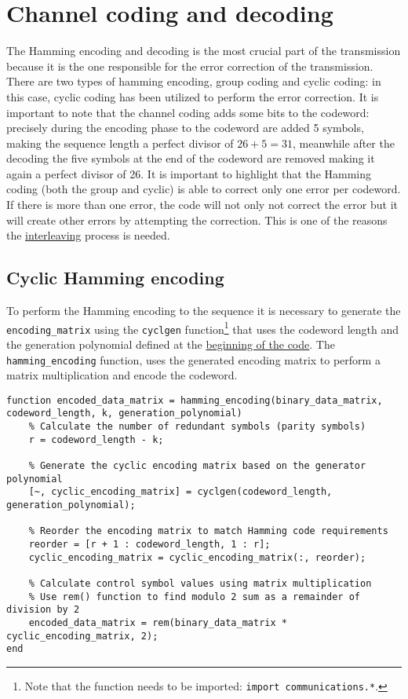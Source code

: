 \vspace{40px} \section{Channel coding and decoding}
The Hamming encoding and decoding is the most crucial part of the transmission because it is the one responsible for the error correction of the transmission. There are two types of hamming encoding, group coding and cyclic coding: in this case, cyclic coding has been utilized to perform the error correction. It is important to note that the channel coding adds some bits to the codeword: precisely during the encoding phase to the codeword are added 5 symbols, making the sequence length a perfect divisor of $26 + 5 = 31$, meanwhile after the decoding the five symbols at the end of the codeword are removed making it again a perfect divisor of 26. It is important to highlight that the Hamming coding (both the group and cyclic) is able to correct only one error per codeword. If there is more than one error, the code will not only not correct the error but it will create other errors by attempting the correction. This is one of the reasons the \hyperref[interleaving]{interleaving} process is needed.





\subsection{Cyclic Hamming encoding}
To perform the Hamming encoding to the sequence it is necessary to generate the \texttt{encoding\_matrix} using the \texttt{cyclgen} function\footnote{Note that the function needs to be imported: \texttt{import communications.*}.} that uses the codeword length and the generation polynomial defined at the \hyperref[initial-parameters]{beginning of the code}. The \texttt{hamming\_encoding} function, uses the generated encoding matrix to perform a matrix multiplication and encode the codeword.

\begin{lstlisting}
function encoded_data_matrix = hamming_encoding(binary_data_matrix, codeword_length, k, generation_polynomial)
    % Calculate the number of redundant symbols (parity symbols)
    r = codeword_length - k;
    
    % Generate the cyclic encoding matrix based on the generator polynomial
    [~, cyclic_encoding_matrix] = cyclgen(codeword_length, generation_polynomial);
    
    % Reorder the encoding matrix to match Hamming code requirements
    reorder = [r + 1 : codeword_length, 1 : r];
    cyclic_encoding_matrix = cyclic_encoding_matrix(:, reorder);
    
    % Calculate control symbol values using matrix multiplication
    % Use rem() function to find modulo 2 sum as a remainder of division by 2
    encoded_data_matrix = rem(binary_data_matrix * cyclic_encoding_matrix, 2);
end
\end{lstlisting}



